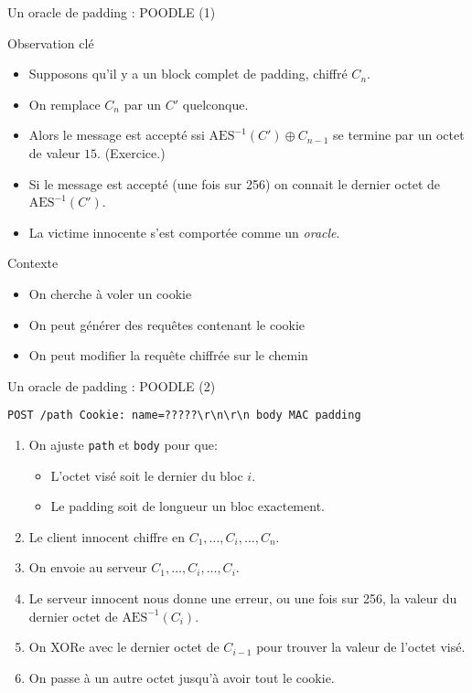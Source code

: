 \documentclass{mpg-ep-slides}
\begin{document}
\begin{frame}{Un oracle de padding : POODLE (1)}
  \begin{block}{Observation clé}
    \begin{itemize}
      \item Supposons qu'il y a un block complet de padding, chiffré $C_n$.
      \item On remplace $C_n$ par un $C'$ quelconque.
      \item Alors le message est accepté ssi $\text{AES}^{-1}(C') \oplus
        C_{n-1}$ se termine par un octet de valeur $15$. (Exercice.)
      \item Si le message est accepté (une fois sur 256) on connait le dernier
        octet de $\text{AES}^{-1}(C')$.
      \item La victime innocente s'est comportée comme un \emph{oracle}.
    \end{itemize}
  \end{block}

  \begin{block}{Contexte}
    \begin{itemize}
      \item On cherche à voler un cookie
      \item On peut générer des requêtes contenant le cookie
      \item On peut modifier la requête chiffrée sur le chemin
    \end{itemize}
  \end{block}
\end{frame}

\begin{frame}[containsverbatim]{Un oracle de padding : POODLE (2)}
  \begin{Verbatim}[gobble=4]
    POST /path Cookie: name=?????\r\n\r\n body MAC padding
  \end{Verbatim}
  \begin{enumerate}
    \item On ajuste \texttt{path} et \texttt{body} pour que:
      \begin{itemize}
        \item L'octet visé soit le dernier du bloc $i$.
        \item Le padding soit de longueur un bloc exactement.
      \end{itemize}
    \item Le client innocent chiffre en $C_1, \dots, C_i, \dots, C_n$.
    \item On envoie au serveur $C_1, \dots, C_i, \dots, C_i$.
    \item Le serveur innocent nous donne une erreur, ou une fois sur 256, la
      valeur du dernier octet de $\text{AES}^{-1}(C_i)$.
    \item On XORe avec le dernier octet de $C_{i-1}$ pour trouver la valeur de
      l'octet visé.
    \item On passe à un autre octet jusqu'à avoir tout le cookie.
  \end{enumerate}
\end{frame}
\end{document}
